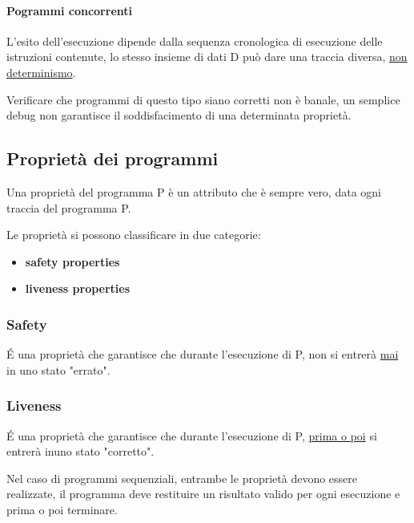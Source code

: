 \paragraph{Pogrammi concorrenti} L'esito dell'esecuzione dipende dalla sequenza cronologica di esecuzione delle istruzioni contenute, lo stesso insieme di dati D può dare una traccia diversa, \underline{non determinismo}.

Verificare che programmi di questo tipo siano corretti non è banale, un semplice debug non garantisce il soddisfacimento di una determinata proprietà.

\subsection{Proprietà dei programmi}

Una proprietà del programma P è un attributo che è sempre vero, data ogni traccia del programma P.

Le proprietà si possono classificare in due categorie:
\begin{itemize}
    \item \textbf{safety properties}
    \item \textbf{liveness properties}
\end{itemize}

\subsubsection{Safety}
É una proprietà che garantisce che durante l'esecuzione di P, non si entrerà \underline{mai} in uno stato "errato".

\subsubsection{Liveness}
É una proprietà che garantisce che durante l'esecuzione di P, \underline{prima o poi} si entrerà inuno stato "corretto".

Nel caso di programmi sequenziali, entrambe le proprietà devono essere realizzate, il programma deve restituire un risultato valido per ogni esecuzione e prima o poi terminare.


